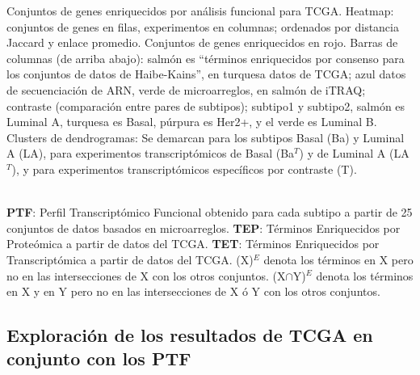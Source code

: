 \documentclass[12pt,twoside]{reedthesis}
\begin{document}
Conjuntos de genes enriquecidos por análisis funcional para TCGA. Heatmap: conjuntos de genes en filas, experimentos en columnas; ordenados por distancia Jaccard y enlace promedio. Conjuntos de genes enriquecidos en rojo. Barras de columnas (de arriba abajo): salmón es ``términos enriquecidos por consenso para los conjuntos de datos de Haibe-Kains'', en turquesa datos de TCGA; azul datos de secuenciación de ARN, verde de microarreglos, en salmón de iTRAQ; contraste (comparación entre pares de subtipos); subtipo1 y subtipo2, salmón es Luminal A, turquesa es Basal, púrpura es Her2+, y el verde es Luminal B. Clusters de dendrogramas: Se demarcan para los subtipos Basal (Ba) y Luminal A (LA), para experimentos transcriptómicos de Basal (Ba\(^T\)) y de Luminal A (LA\(^T\)), y para experimentos transcriptómicos específicos por contraste (T).


\begin{table}[!h]
  \caption{Número de términos enriquecidos compartidos entre plataformas y múltiples ómicas para cada subtipo.}
  \label{tab:migsa2}
  \\ \textbf{PTF}: Perfil Transcriptómico Funcional obtenido para cada subtipo a partir de 25 conjuntos de datos basados en microarreglos. \textbf{TEP}: Términos Enriquecidos por Proteómica a partir de datos del TCGA. \textbf{TET}: Términos Enriquecidos por Transcriptómica a partir de datos del TCGA. (X)$^E$ denota los términos en X pero no en las intersecciones de X con los otros conjuntos. (X$\cap$Y)$^E$ denota los términos en X y en Y pero no en las intersecciones de X ó Y con los otros conjuntos.
\end{table}
\hypertarget{exploraciuxf3n-de-los-resultados-de-tcga-en-conjunto-con-los-ptf}{%
\subsection{Exploración de los resultados de TCGA en conjunto con los PTF}\label{exploraciuxf3n-de-los-resultados-de-tcga-en-conjunto-con-los-ptf}}
\end{document}
